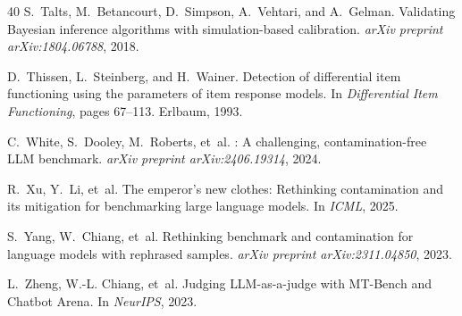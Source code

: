 \documentclass[11pt,a4paper]{article}
\begin{document}
\begin{thebibliography}{40}
S.~Talts, M.~Betancourt, D.~Simpson, A.~Vehtari, and A.~Gelman.
\newblock Validating {Bayesian} inference algorithms with simulation-based calibration.
\newblock \emph{arXiv preprint arXiv:1804.06788}, 2018.

D.~Thissen, L.~Steinberg, and H.~Wainer.
\newblock Detection of differential item functioning using the parameters of item response models.
\newblock In \emph{Differential Item Functioning}, pages 67--113. Erlbaum, 1993.

C.~White, S.~Dooley, M.~Roberts, et~al.
: A challenging, contamination-free {LLM} benchmark.
\newblock \emph{arXiv preprint arXiv:2406.19314}, 2024.

R.~Xu, Y.~Li, et~al.
\newblock The emperor's new clothes: Rethinking contamination and its mitigation for benchmarking large language models.
\newblock In \emph{ICML}, 2025.

S.~Yang, W.~Chiang, et~al.
\newblock Rethinking benchmark and contamination for language models with rephrased samples.
\newblock \emph{arXiv preprint arXiv:2311.04850}, 2023.

L.~Zheng, W.-L. Chiang, et~al.
\newblock Judging {LLM}-as-a-judge with {MT-Bench} and {Chatbot Arena}.
\newblock In \emph{NeurIPS}, 2023.

\end{thebibliography}
\end{document}
